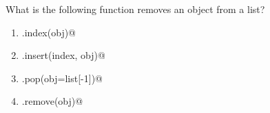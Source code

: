 \question
What is the following function removes an object from a list?

\begin{enumerate}
\item \lstinline@list.index(obj)@
\item \lstinline@list.insert(index, obj)@
\item \lstinline@list.pop(obj=list[-1])@
\item \lstinline@list.remove(obj)@
\end{enumerate}

